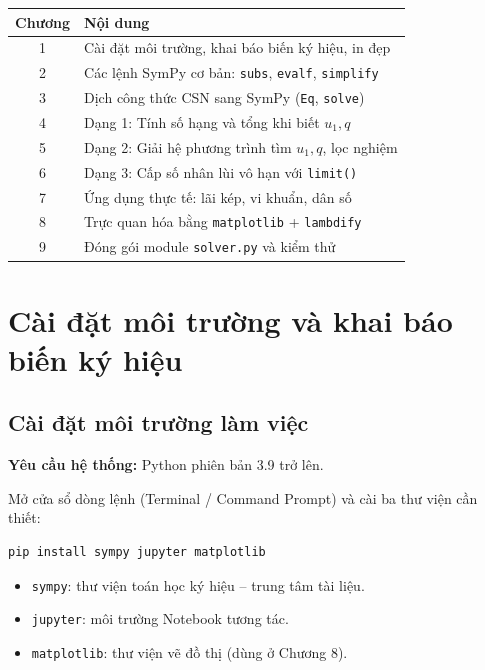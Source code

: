 \documentclass[12pt,a4paper]{report}
\newcommand{\pycmd}[1]{\texttt{\color{kw}#1}}
\begin{document}
\begin{center}
\begin{tabular}{@{}cl@{}}
\toprule
\textbf{Chương} & \textbf{Nội dung}\\
\midrule
1 & Cài đặt môi trường, khai báo biến ký hiệu, in đẹp\\
2 & Các lệnh SymPy cơ bản: \texttt{subs}, \texttt{evalf}, \texttt{simplify}\\
3 & Dịch công thức CSN sang SymPy (\texttt{Eq}, \texttt{solve})\\
4 & Dạng 1: Tính số hạng và tổng khi biết $u_1, q$\\
5 & Dạng 2: Giải hệ phương trình tìm $u_1, q$, lọc nghiệm\\
6 & Dạng 3: Cấp số nhân lùi vô hạn với \texttt{limit()}\\
7 & Ứng dụng thực tế: lãi kép, vi khuẩn, dân số\\
8 & Trực quan hóa bằng \texttt{matplotlib} + \texttt{lambdify}\\
9 & Đóng gói module \texttt{solver.py} và kiểm thử\\
\bottomrule
\end{tabular}
\end{center}

\newpage

\chapter{Cài đặt môi trường và khai báo biến ký hiệu}

\section{Cài đặt môi trường làm việc}

\textbf{Yêu cầu hệ thống:} Python phiên bản 3.9 trở lên.

Mở cửa sổ dòng lệnh (Terminal / Command Prompt) và cài ba thư viện cần
thiết:

\begin{lstlisting}[language=bash,caption={Cài đặt thư viện qua pip},numbers=none]
pip install sympy jupyter matplotlib
\end{lstlisting}

\begin{itemize}
  \item \pycmd{sympy}: thư viện toán học ký hiệu -- trung tâm tài liệu.
  \item \pycmd{jupyter}: môi trường Notebook tương tác.
  \item \pycmd{matplotlib}: thư viện vẽ đồ thị (dùng ở Chương 8).
\end{itemize}
\end{document}

